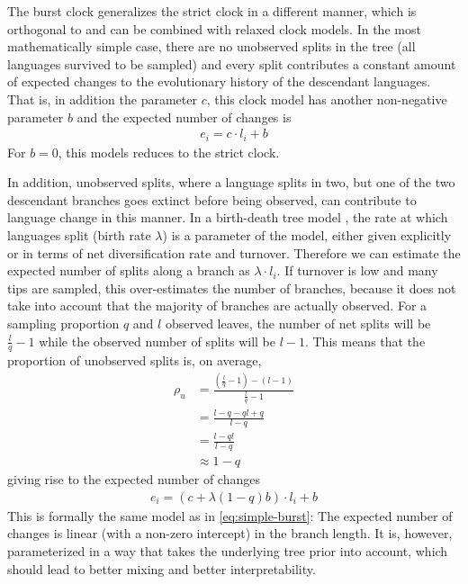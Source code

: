 \documentclass[a4paper,12pt]{scrartcl}
\begin{document}
The burst clock generalizes the strict clock in a different manner, which is
orthogonal to and can be combined with relaxed clock models.
In the most mathematically simple case, there are no unobserved splits in
the tree (all languages survived to be sampled) and every split contributes a
constant amount of expected changes to the evolutionary history of the
descendant languages. That is, in addition the parameter $c$, this clock model
has another non-negative parameter $b$ and the expected number of changes is
\begin{align}
  e_i = c \cdot l_i + b
  \label{eq:simple-burst}
\end{align}
For $b=0$, this models reduces to the strict clock.

%

In addition, unobserved splits, where a language splits in two, but one of
the two descendant branches goes extinct before being observed, can contribute
to language change in this manner.
In a birth-death tree model \parencite{gernhard2008conditioned,stadler2010samplingthroughtime,heath2014fossilized}, the rate at which
languages split (birth rate $\lambda$) is a parameter of the model, either given explicitly or in terms of net diversification rate and turnover. Therefore
we can estimate the expected number of splits along a branch as $\lambda \cdot
l_i$. If turnover is low and many tips are sampled, this over-estimates the number of branches, because it does not take into account that the majority of branches are actually observed. For a sampling proportion $q$ and $l$ observed leaves, the number of net splits will be
$\frac{l}{q} - 1$
while the observed number of splits will be $l - 1$. This means that the proportion of unobserved splits is, on average,
\begin{align}
    \rho_u &= \frac{(\frac{l}{q} - 1) - (l - 1)}{\frac{l}{q} -1} \\
    & = \frac{l - q - ql + q}{l - q} \\
    & = \frac{l - ql}{l - q} \\
    & \approx 1 - q
\end{align}
giving rise to the expected number of changes
\begin{align}
  e_i = (c + \lambda (1-q) b) \cdot l_i + b
  \label{eq:reparam-burst}
\end{align}
This is formally the same model as in \cref{eq:simple-burst}: The expected number of changes is linear (with a non-zero intercept) in the branch length. It is, however, parameterized
in a way that takes the underlying tree prior into account,
which should lead to better mixing and better interpretability.
\end{document}
